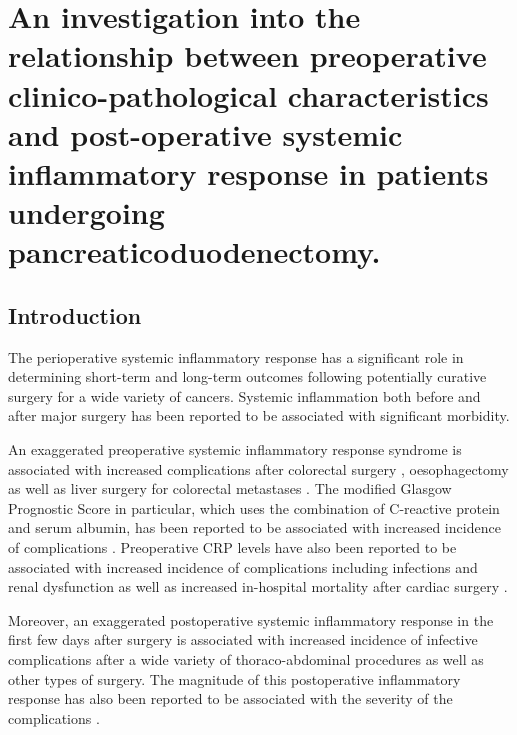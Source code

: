 \chapter{An investigation into the relationship between preoperative clinico-pathological characteristics and post-operative systemic inflammatory response in patients undergoing pancreaticoduodenectomy.}
\label{ch_pre_post_sirs}


\clearpage

\section{Introduction}
The perioperative systemic inflammatory response has a significant role in determining short-term and long-term outcomes following potentially curative surgery for a wide variety of cancers. Systemic inflammation both before and after major surgery has been reported to be associated with significant morbidity. 

An exaggerated preoperative systemic inflammatory response syndrome is associated with increased complications after colorectal surgery \parencite{moyes_preoperative_2009, kubo_elevated_2013}, oesophagectomy \parencite{vashist_glasgow_2010} as well as liver surgery for colorectal metastases \parencite{neal_preoperative_2011}. 
The modified Glasgow Prognostic Score in particular, which uses the combination of C-reactive protein and serum albumin, has been reported to be associated with increased incidence of complications \parencite{moyes_preoperative_2009, mohri_correlation_2014, vashist_glasgow_2010}.
Preoperative CRP levels have also been reported to be associated with increased incidence of complications including infections and renal dysfunction as well as increased in-hospital mortality after cardiac surgery \parencite{lorenzo_increased_2012, mezzomo_preoperative_2011, kim_predictive_2009, biancari_preoperative_2003, boeken_increased_1998}.

Moreover, an exaggerated postoperative systemic inflammatory response in the first few days after surgery is associated with increased incidence of infective complications after a wide variety of thoraco-abdominal procedures\parencite{platt_c-reactive_2012, dutta_persistent_2011, welsch_persisting_2008} as well as other types of surgery\parencite{mcneer_early_2010, laporta_baez_c-reactive_2011}.
The magnitude of this postoperative inflammatory response has also been reported to be associated with the severity of the complications \parencite{mcsorley_postoperative_2015}. 

